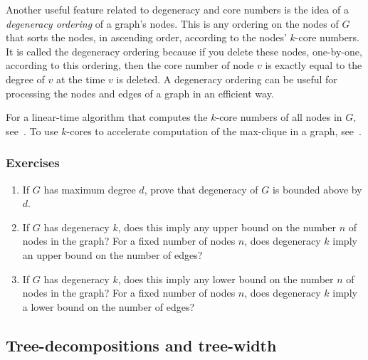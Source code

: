 Another useful feature related to degeneracy and core numbers is the idea of a \emph{degeneracy ordering} of a graph's nodes. This is any ordering on the nodes of $G$ that sorts the nodes, in ascending order, according to the nodes' $k$-core numbers. It is called the degeneracy ordering because if you delete these nodes, one-by-one, according to this ordering, then the core number of node $v$ is exactly equal to the degree of $v$ at the time $v$ is deleted. A degeneracy ordering can be useful for processing the nodes and edges of a graph in an efficient way.

For a linear-time algorithm that computes the $k$-core numbers of all nodes in $G$, see~\cite{batagelj2003m}. To use $k$-cores to accelerate computation of the max-clique in a graph, see~\cite{rossi2014fast}.

\subsubsection{Exercises}\label{sec:degeneracy:exercises}

\begin{enumerate}[label=\ref{sec:degeneracy}.\arabic*]
  \item If $G$ has maximum degree $d$, prove that degeneracy of $G$ is bounded above by $d$.
  \item If $G$ has degeneracy $k$, does this imply any upper bound on the number $n$ of nodes in the graph?
  For a fixed number of nodes $n$, does degeneracy $k$ imply an upper bound on the number of edges?
  \item If $G$ has degeneracy $k$, does this imply any lower bound on the number $n$ of nodes in the graph?
  For a fixed number of nodes $n$, does degeneracy $k$ imply a lower bound on the number of edges?
\end{enumerate}

\subsection{Tree-decompositions and tree-width}\label{sec:tree-decomposition}

